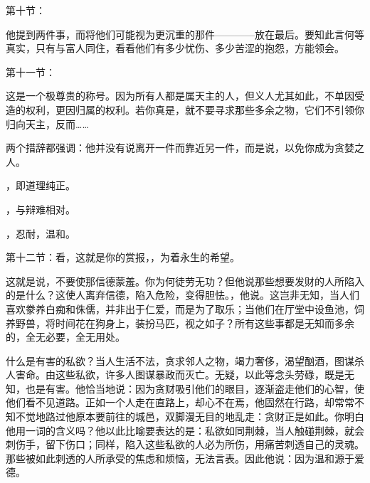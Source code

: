 第十节：\par

他提到两件事，而将他们可能视为更沉重的那件————放在最后。要知此言何等真实，只有与富人同住，看看他们有多少忧伤、多少苦涩的抱怨，方能领会。\par

第十一节：\par

这是一个极尊贵的称号。因为所有人都是属天主的人，但义人尤其如此，不单因受造的权利，更因归属的权利。若你真是，就不要寻求那些多余之物，它们不引领你归向天主，反而……\par

两个措辞都强调：他并没有说离开一件而靠近另一件，而是说，以免你成为贪婪之人。\par

，即道理纯正。\par

，与辩难相对。\par

，忍耐，温和。\par

第十二节：看，这就是你的赏报，，为着永生的希望。\par

这就是说，不要使那信德蒙羞。你为何徒劳无功？但他说那些想要发财的人所陷入的是什么？这使人离弃信德，陷入危险，变得胆怯。，他说。这岂非无知，当人们喜欢豢养白痴和侏儒，并非出于仁爱，而是为了取乐；当他们在厅堂中设鱼池，饲养野兽，将时间花在狗身上，装扮马匹，视之如子？所有这些事都是无知而多余的，全无必要，全无用处。\par

什么是有害的私欲？当人生活不法，贪求邻人之物，竭力奢侈，渴望酗酒，图谋杀人害命。由这些私欲，许多人图谋暴政而灭亡。无疑，以此等念头劳碌，既是无知，也是有害。他恰当地说：因为贪财吸引他们的眼目，逐渐盗走他们的心智，使他们看不见道路。正如一个人走在直路上，却心不在焉，他固然在行路，却常常不知不觉地路过他原本要前往的城邑，双脚漫无目的地乱走：贪财正是如此。你明白他用一词的含义吗？他以此比喻要表达的是：私欲如同荆棘，当人触碰荆棘，就会刺伤手，留下伤口；同样，陷入这些私欲的人必为所伤，用痛苦刺透自己的灵魂。那些被如此刺透的人所承受的焦虑和烦恼，无法言表。因此他说：因为温和源于爱德。\par

